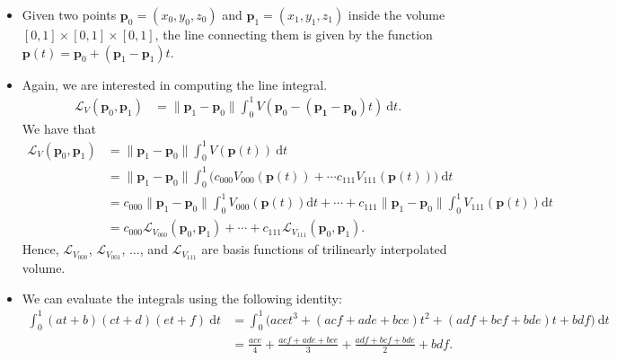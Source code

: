 \documentclass[10pt]{article}
\newcommand{\dee}{\mathrm{d}}
\begin{document}
\begin{itemize}
    \item Given two points $\mathbf{p}_0 = (x_0, y_0, z_0)$ and 
        $\mathbf{p}_1 = (x_1, y_1, z_1)$ inside the volume 
        $[0,1] \times [0,1] \times [0,1]$, the line connecting
        them is given by the function
        $\mathbf{p}(t) = \mathbf{p}_0 + (\mathbf{p}_1 - \mathbf{p}_1)t$.        
    
    \item Again, we are interested in computing the line integral.
        \begin{align*}
            \mathcal{L}_V(\mathbf{p}_0, \mathbf{p}_1) 
            &= \| \mathbf{p}_1 - \mathbf{p}_0 \| \int_0^1 
                V(\mathbf{p}_0 - (\mathbf{p_1} - \mathbf{p_0})t)\ 
                \dee t.
        \end{align*}
        We have that
        \begin{align*}
            \mathcal{L}_V(\mathbf{p}_0, \mathbf{p}_1) 
            &= \| \mathbf{p}_1 - \mathbf{p}_0 \| \int_0^1 
                V(\mathbf{p}(t))\ 
                \dee t \\
            &= \| \mathbf{p}_1 - \mathbf{p}_0 \|
                \int_0^1 \bigg( 
                     c_{000}V_{000}(\mathbf{p}(t)) +
                    \dotsb
                    c_{111}V_{111}(\mathbf{p}(t))
                \bigg)\ \dee t\\
            &= c_{000} \| \mathbf{p}_1 - \mathbf{p}_0 \|
                \int_0^1 V_{000}(\mathbf{p}(t)) \dee t +
                \dotsb +
                c_{111} \| \mathbf{p}_1 - \mathbf{p}_0 \|
                \int_0^1 V_{111}(\mathbf{p}(t)) \dee t\\
            &= c_{000} \mathcal{L}_{V_{000}}(\mathbf{p}_0, \mathbf{p}_1)
                + \dotsb +
                c_{111} \mathcal{L}_{V_{111}}(\mathbf{p}_0, \mathbf{p}_1).
        \end{align*}    
        Hence, $\mathcal{L}_{V_{000}}$, $\mathcal{L}_{V_{001}}$,
        $\dotsc$, and $\mathcal{L}_{V_{111}}$ are basis functions
        of trilinearly interpolated volume.
        
    \item We can evaluate the integrals using the following identity:
        \begin{align*}
            \int_0^1 (at + b)(ct + d)(et + f)\ \dee t
            &= \int_0^1 \big( ace t^3 + (acf + ade + bce)t^2  
            + (adf + bcf + bde)t + bdf \big) \ \dee t \\
            &= \frac{ace}{4} + \frac{acf + ade + bce}{3}
                + \frac{adf + bcf + bde}{2} + bdf.
        \end{align*}
        

\end{itemize}
\end{document}
